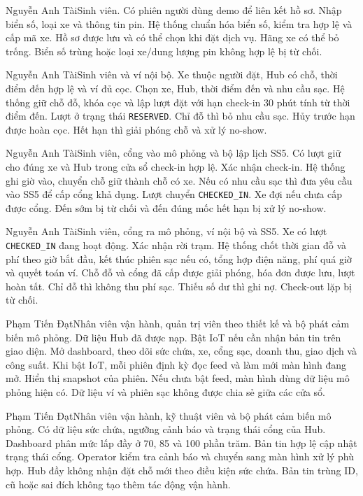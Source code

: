 {Nguyễn Anh Tài}{Sinh viên.}
{Có phiên người dùng demo để liên kết hồ sơ.}
{Nhập biển số, loại xe và thông tin pin. Hệ thống chuẩn hóa biển số, kiểm tra hợp lệ và cấp mã xe.}
{Hồ sơ được lưu và có thể chọn khi đặt dịch vụ. Hãng xe có thể bỏ trống. Biển số trùng hoặc loại xe/dung lượng pin không hợp lệ bị từ chối.}

{Nguyễn Anh Tài}{Sinh viên và ví nội bộ.}
{Xe thuộc người đặt, Hub có chỗ, thời điểm đến hợp lệ và ví đủ cọc.}
{Chọn xe, Hub, thời điểm đến và nhu cầu sạc. Hệ thống giữ chỗ đỗ, khóa cọc và lập lượt đặt với hạn check-in 30 phút tính từ thời điểm đến.}
{Lượt ở trạng thái \texttt{RESERVED}. Chỉ đỗ thì bỏ nhu cầu sạc. Hủy trước hạn được hoàn cọc. Hết hạn thì giải phóng chỗ và xử lý no-show.}

{Nguyễn Anh Tài}{Sinh viên, cổng vào mô phỏng và bộ lập lịch SS5.}
{Có lượt giữ cho đúng xe và Hub trong cửa sổ check-in hợp lệ.}
{Xác nhận check-in. Hệ thống ghi giờ vào, chuyển chỗ giữ thành chỗ có xe. Nếu có nhu cầu sạc thì đưa yêu cầu vào SS5 để cấp cổng khả dụng.}
{Lượt chuyển \texttt{CHECKED\_IN}. Xe đợi nếu chưa cấp được cổng. Đến sớm bị từ chối và đến đúng mốc hết hạn bị xử lý no-show.}

{Nguyễn Anh Tài}{Sinh viên, cổng ra mô phỏng, ví nội bộ và SS5.}
{Xe có lượt \texttt{CHECKED\_IN} đang hoạt động.}
{Xác nhận rời trạm. Hệ thống chốt thời gian đỗ và phí theo giờ bắt đầu, kết thúc phiên sạc nếu có, tổng hợp điện năng, phí quá giờ và quyết toán ví.}
{Chỗ đỗ và cổng đã cấp được giải phóng, hóa đơn được lưu, lượt hoàn tất. Chỉ đỗ thì không thu phí sạc. Thiếu số dư thì ghi nợ. Check-out lặp bị từ chối.}

{Phạm Tiến Đạt}{Nhân viên vận hành, quản trị viên theo thiết kế và bộ phát cảm biến mô phỏng.}
{Dữ liệu Hub đã được nạp. Bật IoT nếu cần nhận bản tin trên giao diện.}
{Mở dashboard, theo dõi sức chứa, xe, cổng sạc, doanh thu, giao dịch và công suất. Khi bật IoT, mỗi phiên định kỳ đọc feed và làm mới màn hình đang mở.}
{Hiển thị snapshot của phiên. Nếu chưa bật feed, màn hình dùng dữ liệu mô phỏng hiện có. Dữ liệu ví và phiên sạc không được chia sẻ giữa các cửa sổ.}

{Phạm Tiến Đạt}{Nhân viên vận hành, kỹ thuật viên và bộ phát cảm biến mô phỏng.}
{Có dữ liệu sức chứa, ngưỡng cảnh báo và trạng thái cổng của Hub.}
{Dashboard phân mức lấp đầy ở 70, 85 và 100 phần trăm. Bản tin hợp lệ cập nhật trạng thái cổng. Operator kiểm tra cảnh báo và chuyển sang màn hình xử lý phù hợp.}
{Hub đầy không nhận đặt chỗ mới theo điều kiện sức chứa. Bản tin trùng ID, cũ hoặc sai đích không tạo thêm tác động vận hành.}

